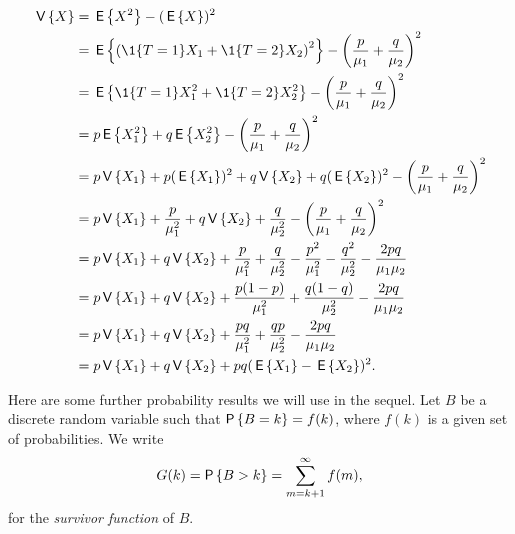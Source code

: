 \begin{exercise}
\begin{solution}
\begin{equation*}
  \begin{split}
  \V X 
&= \E{X^2} - (\E X)^2 \\
&= \E{\left(\1{T=1} X_1 + \1{T=2} X_2\right)^2} - \left(\frac{p}{\mu_1}+\frac{q}{\mu_2}\right)^2 \\
&= \E{\1{T=1} X_1^2 + \1{T=2} X_2^2} - \left(\frac{p}{\mu_1}+\frac{q}{\mu_2}\right)^2 \\ 
&= p \E{X_1^2} + q \E{X_2^2} - \left(\frac{p}{\mu_1}+\frac{q}{\mu_2}\right)^2 \\ 
&= p \V{X_1} + p (\E{X_1})^2 + q \V{X_2} + q(\E{ X_2})^2 - \left(\frac{p}{\mu_1}+\frac{q}{\mu_2}\right)^2 \\ 
&= p \V{X_1} + \frac{p}{\mu_1^2} + q \V{X_2} + \frac{q}{\mu_2^2} - \left(\frac{p}{\mu_1}+\frac{q}{\mu_2}\right)^2 \\ 
&= p \V{X_1} + q \V{X_2}
+ \frac{p}{\mu_1^2} + \frac{q}{\mu_2^2}
- \frac{p^2}{\mu_1^2}-\frac{q^2}{\mu_2^2}  -\frac{2pq}{\mu_1\mu_2}\\ 
&= p \V{X_1} + q \V{X_2}
+ \frac{p(1-p)}{\mu_1^2} + \frac{q(1-q)}{\mu_2^2}
-\frac{2pq}{\mu_1\mu_2}\\ 
&= p \V{X_1} + q \V{X_2}
+ \frac{pq}{\mu_1^2} + \frac{qp}{\mu_2^2}
-\frac{2pq}{\mu_1\mu_2}\\ 
&= p \V{X_1} + q \V{X_2}
+ pq(\E{X_1} - \E{X_2})^2.
\end{split}
\end{equation*}
\end{solution}
\end{exercise}


Here are some further probability results we will use in the sequel. Let $B$ be a discrete random variable  such that $\P{B = k} = f(k)$, where $f(k)$ is a given set of
probabilities. We write
\begin{equation*}
  G(k) = \P{B>k} = \sum_{m=k+1}^\infty f(m),
\end{equation*}
for the \emph{survivor function} of $B$.  

